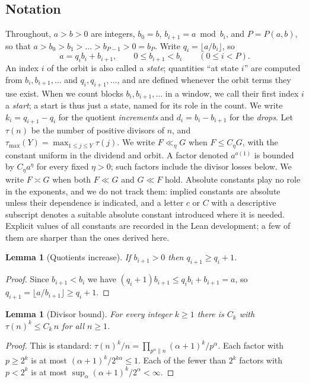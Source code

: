 \documentclass[11pt]{article}
\newtheorem{lemma}[theorem]{Lemma}
\theoremstyle{definition}
\theoremstyle{remark}
\begin{document}
\subsection{Notation}
Throughout, $a>b>0$ are integers, $b_0=b$, $b_{i+1}=a\bmod b_i$, and $P=P(a,b)$, so that
$a>b_0>b_1>\dots>b_{P-1}>0=b_P$. Write $q_i=\lfloor a/b_i\rfloor$, so
\[
a=q_ib_i+b_{i+1},\qquad 0\le b_{i+1}<b_i\qquad(0\le i<P).
\]
An index $i$ of the orbit is also called a \emph{state}; quantities ``at state $i$'' are
computed from $b_i,b_{i+1},\dots$ and $q_i,q_{i+1},\dots$, and are defined whenever the
orbit terms they use exist. When we count blocks $b_i,b_{i+1},\dots$ in a window, we call
their first index $i$ a \emph{start}; a start is thus just a state, named for its role in the
count. We write
$k_i=q_{i+1}-q_i$ for the quotient \emph{increments} and $d_i=b_i-b_{i+1}$ for the
\emph{drops}.
Let $\tau(n)$ be the number of positive divisors of $n$, and
$\tau_{\max}(Y)=\max_{1\le j\le Y}\tau(j)$.
We write $F\ll_\eta G$ when $F\le C_\eta G$, with the constant uniform in the
dividend and orbit. A factor denoted $a^{o(1)}$ is bounded by
$C_\eta a^\eta$ for every fixed $\eta>0$; such factors include the divisor
losses below. We write $F\asymp G$ when both $F\ll G$ and $G\ll F$ hold.
Absolute constants play no role in the exponents, and we do not track them:
implied constants are absolute unless their dependence is indicated, and a
letter $c$ or $C$ with a descriptive subscript denotes a suitable absolute
constant introduced where it is needed. Explicit values of all
constants are recorded in the Lean development; a few of them are sharper than
the ones derived here.

\begin{lemma}[Quotients increase]\label{lem:quot}
If $b_{i+1}>0$ then $q_{i+1}\ge q_i+1$.
\end{lemma}

\begin{proof}
Since $b_{i+1}<b_i$ we have $(q_i+1)b_{i+1}\le q_ib_i+b_{i+1}=a$, so
$q_{i+1}=\lfloor a/b_{i+1}\rfloor\ge q_i+1$.
\end{proof}

\begin{lemma}[Divisor bound]\label{lem:div}
For every integer $k\ge1$ there is $C_k$ with $\tau(n)^k\le C_k\,n$ for all $n\ge1$.
\end{lemma}

\begin{proof}
This is standard: $\tau(n)^k/n=\prod_{p^\alpha\| n}(\alpha+1)^k/p^\alpha$. Each factor with
$p\ge 2^k$ is at most $(\alpha+1)^k/2^{k\alpha}\le1$. Each of the fewer than $2^k$ factors with
$p<2^k$ is at most $\sup_\alpha(\alpha+1)^k/2^\alpha<\infty$.
\end{proof}
\end{document}

